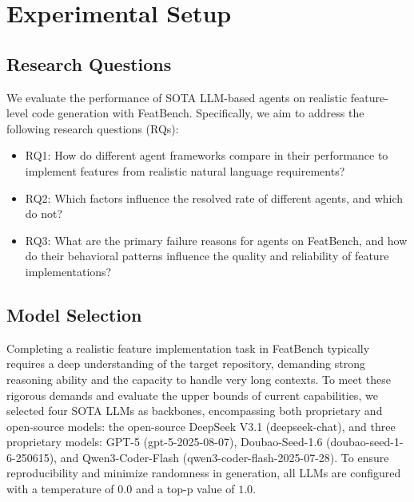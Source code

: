 \section{Experimental Setup}
\subsection{Research Questions}

We evaluate the performance of SOTA LLM-based agents on realistic feature-level code generation with FeatBench. Specifically, we aim to address the following research questions (RQs):
\begin{itemize}
    \item RQ1: How do different agent frameworks compare in their performance to implement features from realistic natural language requirements?
    \item RQ2: Which factors influence the resolved rate of different agents, and which do not?
    \item RQ3: What are the primary failure reasons for agents on FeatBench, and how do their behavioral patterns influence the quality and reliability of feature implementations?
\end{itemize}

\subsection{Model Selection}
Completing a realistic feature implementation task in FeatBench typically requires a deep understanding of the target repository, demanding strong reasoning ability and the capacity to handle very long contexts. To meet these rigorous demands and evaluate the upper bounds of current capabilities, we selected four SOTA LLMs as backbones, encompassing both proprietary and open-source models:
the open-source DeepSeek V3.1 (deepseek-chat), and three proprietary models: GPT-5 (gpt-5-2025-08-07), Doubao-Seed-1.6 (doubao-seed-1-6-250615), and Qwen3-Coder-Flash (qwen3-coder-flash-2025-07-28).
To ensure reproducibility and minimize randomness in generation, all LLMs are configured with a temperature of $0.0$ and a top-p value of $1.0$.

